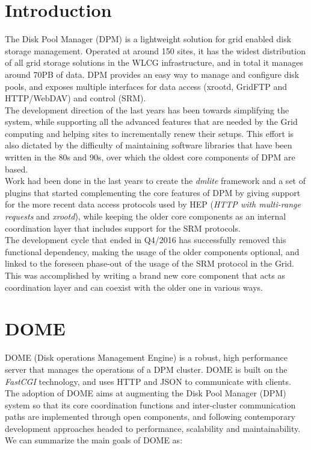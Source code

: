 \documentclass[a4paper]{jpconf}
\begin{document}
\section{Introduction}
The Disk Pool Manager (DPM) is a lightweight solution for grid enabled disk storage
management. Operated at around 150 sites, it has the widest distribution of all grid storage
solutions in the WLCG infrastructure, and in total it manages around 70PB of data. DPM provides
an easy way to manage and configure disk pools, and exposes multiple interfaces for
data access (xrootd, GridFTP and HTTP/WebDAV) and control (SRM).\\
The development direction of the last years has been towards simplifying the
system, while supporting all the advanced features that are needed by the Grid computing and
helping sites to incrementally renew their setups.
This effort is also dictated by the difficulty of maintaining software libraries that have been
written in the 80s and 90s, over which the oldest core components of DPM are based.\\
Work had been done in the last years to create the \textit{dmlite} \cite{dpmfuture} framework and a set of plugins
that started complementing the core features of DPM by giving support for the more recent
data access protocols used by HEP (\textit{HTTP with multi-range requests} and \textit{xrootd}),
while keeping the older core components as an internal coordination layer that includes
support for the SRM protocols.\\
The development cycle that ended in Q4/2016 has successfully removed this functional
dependency, making the usage of the older components optional, and linked to the
foreseen phase-out of the usage of the SRM protocol in the Grid. This was accomplished by
writing a brand new core component that acts as coordination layer and can coexist with the
older one in various ways.


\section{DOME}

DOME (Disk operations Management Engine) is a robust, high performance server that manages the operations of a DPM cluster. DOME is built on the \textit{FastCGI} \cite{fastcgi} technology,
and uses HTTP and JSON to communicate with clients.
The adoption of DOME aims at augmenting the Disk Pool Manager (DPM) system so that its core coordination functions and inter-cluster communication paths are
implemented through open components, and following contemporary development approaches headed to performance, scalability and maintainability. We can summarize the
main goals of DOME as:
\end{document}
